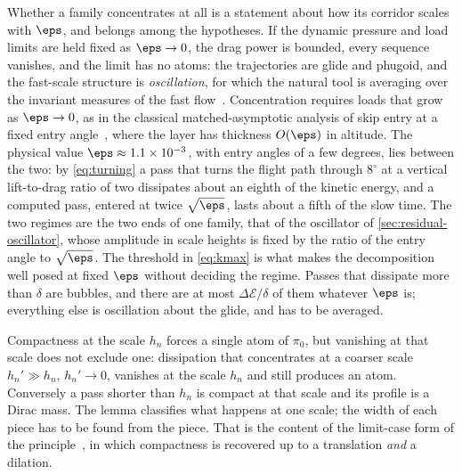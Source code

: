 \begin{remark}
\label{rem:regimes}
Whether a family concentrates at all is a statement about how its corridor
scales with $\eps$, and belongs among the hypotheses. If the dynamic
pressure and load limits are held fixed as $\eps\to 0$, the drag power is
bounded, every sequence vanishes, and the limit has no atoms: the
trajectories are glide and phugoid, and the fast-scale structure is
\emph{oscillation}, for which the natural tool is averaging over the
invariant measures of the fast flow~\cite{artstein1999invariant}.
Concentration requires loads that grow as $\eps\to 0$, as in the classical
matched-asymptotic analysis of skip entry at a fixed entry
angle~\cite{shi1971skip}, where the layer has thickness $O(\eps)$ in
altitude. The physical value $\eps\approx 1.1\times10^{-3}$, with entry
angles of a few degrees, lies between the two: by \cref{eq:turning} a pass
that turns the flight path through $8^\circ$ at a vertical lift-to-drag
ratio of two dissipates about an eighth of the kinetic energy, and a
computed pass, entered at twice $\sqrt{\eps}$, lasts about a fifth of the
slow time. The two regimes are the two ends of one family, that of the
oscillator of \cref{sec:residual-oscillator}, whose amplitude in scale
heights is fixed by the ratio of the entry angle to $\sqrt{\eps}$.
The threshold in \cref{eq:kmax} is what makes the decomposition well posed
at fixed $\eps$ without deciding the regime. Passes that dissipate more
than $\delta$ are bubbles, and there are at most $\Delta\mathcal{E}/\delta$
of them whatever $\eps$ is; everything else is oscillation about the
glide, and has to be averaged.
\end{remark}

\begin{remark}
Compactness at the scale $h_n$ forces a single atom of $\pi_0$, but
vanishing at that scale does not exclude one: dissipation that concentrates
at a coarser scale $h_n'\gg h_n$, $h_n'\to 0$, vanishes at the scale $h_n$
and still produces an atom. Conversely a pass shorter than $h_n$ is compact
at that scale and its profile is a Dirac mass. The lemma classifies what
happens at one scale; the width of each piece has to be found from the
piece. That is the content of the limit-case form of the
principle~\cite{lions1985limit1}, in which compactness is recovered up to a
translation \emph{and} a dilation.
\end{remark}

